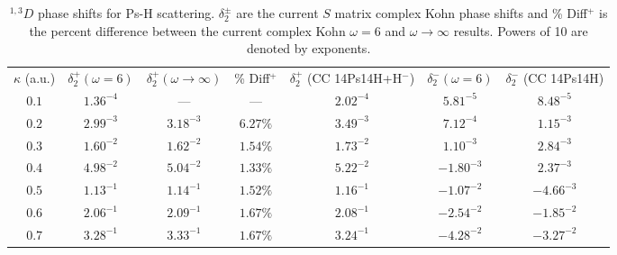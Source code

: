 \documentclass[preprint,showpacs,showkeys,preprintnumbers,amsmath,amssymb,longbibliography,pra,aps]{revtex4-1}
\begin{document}
{\begin{table}
\begin{center}
\begin{ruledtabular}
\begin{tabular}{c | c c c c | c c}
$\kappa$ (a.u.) & $\delta_2^+ (\omega = 6)$ & $\delta_2^+ (\omega \rightarrow \infty)$ & \% Diff$^+$ & $\delta_2^+$ (CC 14Ps14H+H$^-$) \cite{Walters2004} & $\delta_2^- (\omega = 6)$ & $\delta_2^-$ (CC 14Ps14H) \cite{Blackwood2002} \\
\colrule
$0.1$ & $1.36^{-4}$ & --- & --- & $2.02^{-4}$ & $5.81^{-5}$ & $8.48^{-5}$ \\
$0.2$ & $2.99^{-3}$ & $3.18^{-3}$ & $6.27\%$ & $3.49^{-3}$ & $7.12^{-4}$ & $1.15^{-3}$ \\
$0.3$ & $1.60^{-2}$ & $1.62^{-2}$ & $1.54\%$ & $1.73^{-2}$ & $1.10^{-3}$ & $2.84^{-3}$ \\
$0.4$ & $4.98^{-2}$ & $5.04^{-2}$ & $1.33\%$ & $5.22^{-2}$ & $-1.80^{-3}$ & $2.37^{-3}$ \\
$0.5$ & $1.13^{-1}$ & $1.14^{-1}$ & $1.52\%$ & $1.16^{-1}$ & $-1.07^{-2}$ & $-4.66^{-3}$ \\
$0.6$ & $2.06^{-1}$ & $2.09^{-1}$ & $1.67\%$ & $2.08^{-1}$ & $-2.54^{-2}$ & $-1.85^{-2}$ \\
$0.7$ & $3.28^{-1}$ & $3.33^{-1}$ & $1.67\%$ & $3.24^{-1}$ & $-4.28^{-2}$ & $-3.27^{-2}$ \\
\end{tabular}
\end{ruledtabular}
\caption{$^{1,3}D$ phase shifts for Ps-H scattering. $\delta_2^\pm$ are the current
$S$ matrix complex Kohn phase shifts and \% Diff$^+$ is the percent difference
between the current complex Kohn $\omega = 6$ and $\omega \rightarrow \infty$
results. Powers of 10 are denoted by exponents.}
\label{tab:DWavePhase}
\end{center}
\end{table}



}
\end{document}
